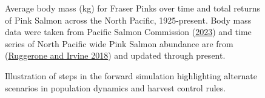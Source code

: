 \documentclass[11pt]{book}
\begin{document}
\begin{figure}[htb]

{\centering {} 

}

\caption{Average body mass (kg) for Fraser Pinks over time and total returns of Pink Salmon across the North Pacific, 1925-present. Body mass data were taken from Pacific Salmon Commission (\protect\hyperlink{ref-pacificsalmoncommissionPSCBiologicalData2023}{2023}) and time series of North Pacific wide Pink Salmon abundance are from (\protect\hyperlink{ref-ruggeroneNumbersBiomassNatural2018}{Ruggerone and Irvine 2018}) and updated through present.}\label{fig:fig-avg-mass}
\end{figure}

\begin{figure}[htb]

{\centering {} 

}

\caption{Illustration of steps in the forward simulation highlighting alternate scenarios in population dynamics and harvest control rules.}\label{fig:fig-schematic}
\end{figure}
\end{document}
